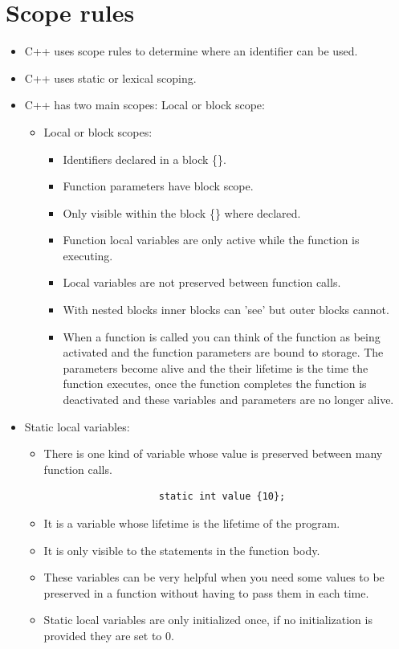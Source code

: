 \section{Scope rules}
\begin{itemize}
    \item C++ uses scope rules to determine where an identifier can be used.
    \item C++ uses static or lexical scoping.
    \item C++ has two main scopes: Local or block scope:
        \begin{itemize}
            \item Local or block scopes:
                \begin{itemize}
                    \item Identifiers declared in a block \{\}.
                    \item Function parameters have block scope.
                    \item Only visible within the block \{\} where declared.
                    \item Function local variables are only active while the function is executing.
                    \item Local variables are not preserved between function calls.
                    \item With nested blocks inner blocks can 'see' but outer blocks cannot.
                    \item When a function is called you can think of the function as being activated and the function parameters are bound to storage. The parameters become alive and the their lifetime is the time the function executes, once the function completes the function is deactivated and these variables and parameters are no longer alive.
                \end{itemize}
        \end{itemize}
    
    \item Static local variables:
        \begin{itemize}
            \item There is one kind of variable whose value is preserved between many function calls.
                \begin{verbatim}
                    static int value {10};
                \end{verbatim}
            \item It is a variable whose lifetime is the lifetime of the program.
            \item It is only visible to the statements in the function body.
            \item These variables can be very helpful when you need some values to be preserved in a function without having to pass them in each time.
            \item Static local variables are only initialized once, if no initialization is provided they are set to 0.
        \end{itemize}


\end{itemize}
